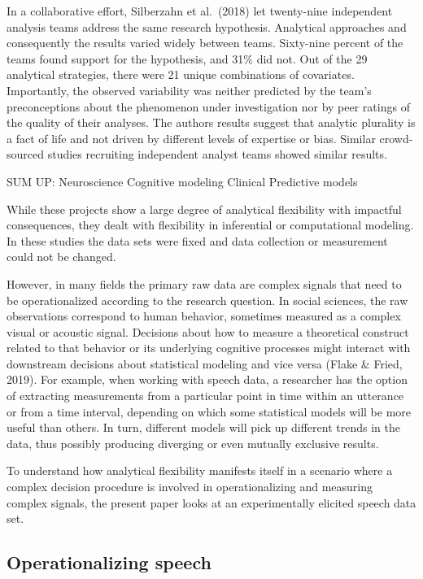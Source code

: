 \documentclass[
  english,
  man]{apa6}
\begin{document}
In a collaborative effort, Silberzahn et al.~(2018) let twenty-nine independent analysis teams address the same research hypothesis.
Analytical approaches and consequently the results varied widely between teams.
Sixty-nine percent of the teams found support for the hypothesis, and 31\% did not.
Out of the 29 analytical strategies, there were 21 unique combinations of covariates.
Importantly, the observed variability was neither predicted by the team's preconceptions about the phenomenon under investigation nor by peer ratings of the quality of their analyses.
The authors results suggest that analytic plurality is a fact of life and not driven by different levels of expertise or bias.
Similar crowd-sourced studies recruiting independent analyst teams showed similar results.

SUM UP:
Neuroscience
Cognitive modeling
Clinical
Predictive models

While these projects show a large degree of analytical flexibility with impactful consequences, they dealt with flexibility in inferential or computational modeling.
In these studies the data sets were fixed and data collection or measurement could not be changed.

However, in many fields the primary raw data are complex signals that need to be operationalized according to the research question.
In social sciences, the raw observations correspond to human behavior, sometimes measured as a complex visual or acoustic signal.
Decisions about how to measure a theoretical construct related to that behavior or its underlying cognitive processes might interact with downstream decisions about statistical modeling and vice versa (Flake \& Fried, 2019).
For example, when working with speech data, a researcher has the option of extracting measurements from a particular point in time within an utterance or from a time interval, depending on which some statistical models will be more useful than others.
In turn, different models will pick up different trends in the data, thus possibly producing diverging or even mutually exclusive results.

To understand how analytical flexibility manifests itself in a scenario where a complex decision procedure is involved in operationalizing and measuring complex signals, the present paper looks at an experimentally elicited speech data set.

\hypertarget{operationalizing-speech}{%
\subsection{Operationalizing speech}\label{operationalizing-speech}}
\end{document}
